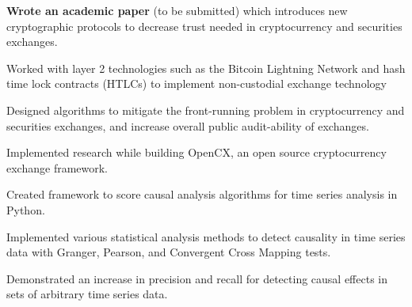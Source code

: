 
\begin{tightemize}
  \item \textbf{Wrote an academic paper} (to be submitted) which
      introduces new cryptographic protocols to decrease trust needed
      in cryptocurrency and securities exchanges.
  \item Worked with layer 2 technologies such as the Bitcoin Lightning
      Network and hash time lock contracts (HTLCs) to implement
      non-custodial exchange technology
  \item Designed algorithms to mitigate the front-running problem in
      cryptocurrency and securities exchanges, and increase overall
      public audit-ability of exchanges.
  \item Implemented research while building OpenCX, an open source
      cryptocurrency exchange framework.
\end{tightemize}
\subsectionsep

\begin{tightemize}
\item Created framework to score causal analysis algorithms for time
    series analysis in Python.
\item Implemented various statistical analysis methods to detect
    causality in time series data with Granger, Pearson, and
    Convergent Cross Mapping tests.
\item Demonstrated an increase in precision and recall for detecting
    causal effects in sets of arbitrary time series data.
\end{tightemize}
\subsectionsep

